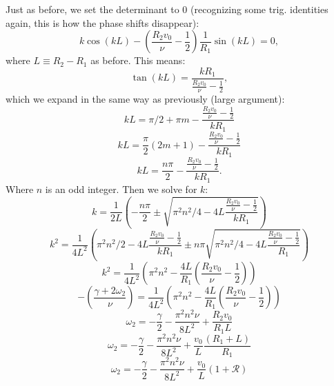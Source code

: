 \documentclass[12pt]{article}
\begin{document}
 	Just as before, we set the determinant to $0$ (recognizing some trig. identities again, this is how the phase shifts disappear):
 	\begin{equation}
 	k\cos(kL) - \left(\frac{R_2v_0}{\nu} -\frac{1}{2}\right)\frac{1}{R_1}\sin(kL) = 0,
 	\end{equation}
 	where $L \equiv R_2 - R_1$ as before.  This means:
 	\[\tan(kL) = \frac{kR_1}{\frac{R_2v_0}{\nu} - \frac{1}{2}},\]
 	which we expand in the same way as previously (large argument):
 	\[kL = \pi / 2 + \pi m - \frac{\frac{R_2v_0}{\nu} - \frac{1}{2}}{kR_1}\]
 	\[kL = \frac{\pi}{2}(2m + 1) - \frac{\frac{R_2v_0}{\nu} - \frac{1}{2}}{kR_1}\]
 	\[kL = \frac{n \pi}{2}- \frac{\frac{R_2v_0}{\nu} - \frac{1}{2}}{kR_1}.\]
 	Where $n$ is an odd integer.  Then we solve for $k$:
 	\[ k = \frac{1}{2L}\left(-\frac{n\pi}{2} \pm \sqrt{\pi^2n^2/4 - 4L\frac{\frac{R_2v_0}{\nu} - \frac{1}{2}}{kR_1}}\right) \]
 	\[k^2 = \frac{1}{4L^2} \left( \pi^2n^2/2 - 4L\frac{\frac{R_2v_0}{\nu} - \frac{1}{2}}{kR_1} \pm n \pi \sqrt{\pi^2n^2/4 - 4L\frac{\frac{R_2v_0}{\nu} - \frac{1}{2}}{R_1}} \right)\]
 	\[ k^2 = \frac{1}{4L^2} \left( \pi^2n^2 - \frac{4L}{R_1}\left(\frac{R_2 v_0}{\nu} - \frac{1}{2}\right)\right)\]
 	\[-\left( \frac{\gamma + 2\omega_2}{\nu} \right) = \frac{1}{4L^2} \left( \pi^2n^2 - \frac{4L}{R_1}\left(\frac{R_2 v_0}{\nu} - \frac{1}{2}\right)\right)\]
 	\[ \omega_2 = -\frac{\gamma}{2} - \frac{\pi^2n^2\nu}{8L^2} + \frac{R_2v_0}{R_1L} \]
 	\[ \omega_2 = -\frac{\gamma}{2} - \frac{\pi^2n^2\nu}{8L^2} + \frac{v_0}{L}\frac{(R_1 + L)}{R_1} \]
 	\begin{equation}
 	\omega_2 = -\frac{\gamma}{2} - \frac{\pi^2n^2\nu}{8L^2} + \frac{v_0}{L}(1 + \mathcal{R})
 	\end{equation}
\end{document}
